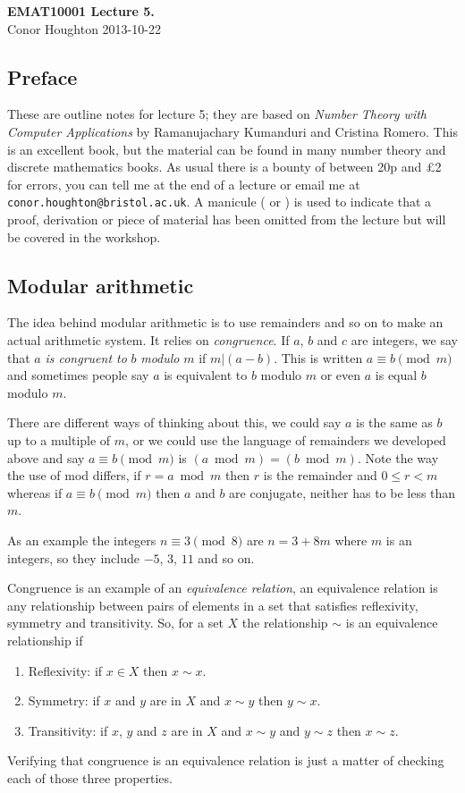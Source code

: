 \documentclass[12pt]{article}
\begin{document}
\begin{center}
{\bf EMAT10001 Lecture 5.}\\[1cm]{} Conor Houghton 2013-10-22
\end{center}
\subsection*{Preface} 
These are outline notes for lecture 5; they are based on \emph{Number
  Theory with Computer Applications} by Ramanujachary Kumanduri and
Cristina Romero. This is an excellent book, but the material can be
found in many number theory and discrete mathematics books. As usual
there is a bounty of between 20p and \pounds 2 for errors, you can
tell me at the end of a lecture or email me at
\texttt{conor.houghton{@}bristol.ac.uk}. A manicule (\HandLeft{} or \HandRight) is used to
indicate that a proof, derivation or piece of material has been
omitted from the lecture but will be covered in the workshop.

\subsection*{Modular arithmetic}

The idea behind modular arithmetic is to use remainders and so on to make an actual arithmetic system. It relies on
\emph{congruence}. If $a$, $b$ and $c$ are integers, we say that $a$
\emph{is congruent to } $b$ \emph{modulo} $m$ if $m|(a-b)$. This is
written $a\equiv b\pmod m$ and sometimes people say $a$ is equivalent
to $b$ modulo $m$ or even $a$ is equal $b$ modulo $m$. 

There are different ways of thinking about this, we could say $a$ is
the same as $b$ up to a multiple of $m$, or we could use the language
of remainders we developed above and say $a\equiv b \pmod m$ is $(a
\bmod m)=(b \bmod m)$. Note the way the use of mod differs, if
$r=a\bmod m$ then $r$ is the remainder and $0\le r<m$ whereas if
$a\equiv b\pmod m$ then $a$ and $b$ are conjugate, neither has to be
less than $m$.

As an example the integers $n\equiv 3\pmod 8$ are $n=3+8m$ where $m$
is an integers, so they include $-5$, $3$, $11$ and so on. 

Congruence is an example of an \emph{equivalence relation}, an
equivalence relation is any relationship between pairs of elements in
a set that satisfies reflexivity, symmetry and transitivity. So, for a
set $X$ the relationship $\sim$ is an equivalence relationship if
\begin{enumerate}
\item Reflexivity: if $x\in X$ then $x\sim x$.
\item Symmetry: if $x$ and $y$ are in $X$ and $x\sim y$ then $y\sim x$.
\item Transitivity: if $x$, $y$ and $z$ are in $X$ and $x\sim y$ and
  $y\sim z$ then $x\sim z$.
\end{enumerate}
Verifying that congruence is an equivalence relation is just a matter of checking each of those three properties.\HandLeft
\end{document}

